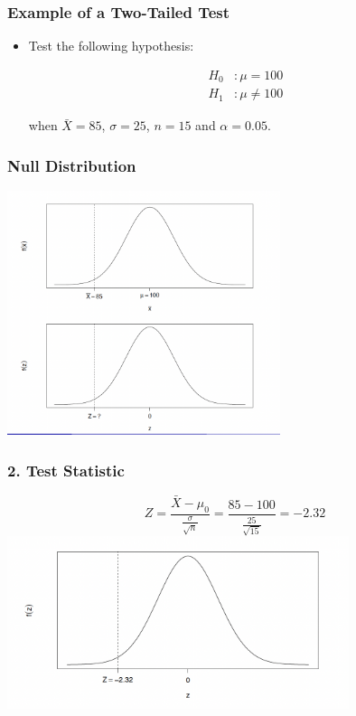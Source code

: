 \documentclass[12pt]{beamer}
\begin{document}
\begin{frame}
	\frametitle{Example of a Two-Tailed Test}
	
	\begin{itemize}[label={\color{blue}$\blacktriangleright$}]
		\item Test the following hypothesis:
		
		\vspace{0.5cm}
		
		\begin{align*}
			H_0 &: \mu = 100 \\
			H_1 &: \mu \neq 100
		\end{align*}
		
		\vspace{0.5cm}
		
		when $\bar{X} = 85$, $\sigma = 25$, $n = 15$ and $\alpha = 0.05$.
	\end{itemize}
	
\end{frame}
\begin{frame}
	\frametitle{Null Distribution}
	
	\centering
	\includegraphics[width=8cm]{null2.png}
	
	
\end{frame}
\begin{frame}
	\frametitle{2. Test Statistic}
	
	\begin{equation*}
		Z = \frac{\bar{X} - \mu_0}{\frac{\sigma}{\sqrt{n}}} = \frac{85 - 100}{\frac{25}{\sqrt{15}}} = -2.32
	\end{equation*}
	\vspace{0.7cm}
	\centering
	\includegraphics[width=10cm]{test232.png}
\end{frame}
\end{document}
